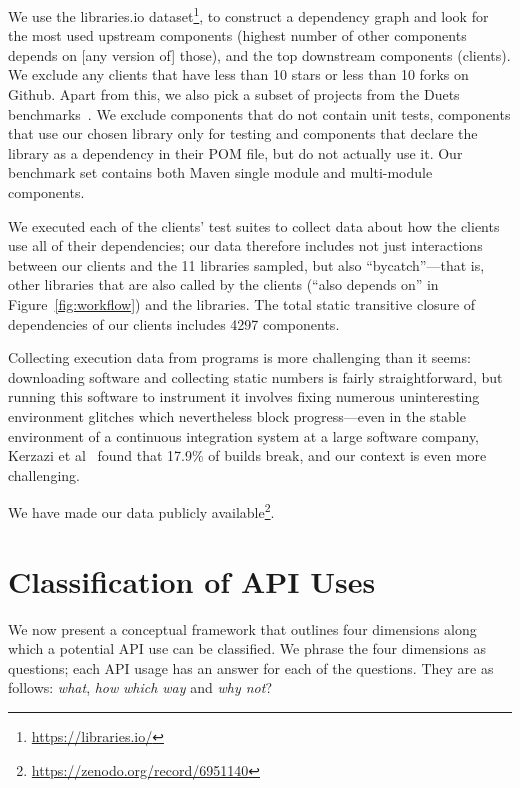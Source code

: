 We use the libraries.io dataset\footnote{\url{https://libraries.io/}}, to construct a dependency graph and look for the most used upstream components (highest number of other components depends on [any version of] those), 
and the top downstream components (clients). We exclude any clients that have less than 10 stars or less than 10 forks on Github.  Apart from this, we also pick a subset of projects from the
Duets benchmarks~\cite{durieux21}. We exclude components that do not contain unit tests, components that use our chosen library only for testing
and components that declare the library as a dependency in their POM file, but do not actually use it. Our benchmark set contains both Maven single module and multi-module components.

We executed each of the clients' test suites to collect data about how the clients use all of their dependencies; our data therefore includes not just interactions between our clients and the 11 libraries sampled, but also ``bycatch''---that is, other libraries that are also called by the clients (``also depends on'' in Figure~\ref{fig:workflow}) and the libraries. The total static transitive closure of dependencies of our clients includes 4297 components.

Collecting execution data from programs is more challenging than it seems: downloading software and collecting static numbers is fairly straightforward, but running this software to instrument it involves fixing numerous uninteresting environment glitches which nevertheless block progress---even in the stable environment of a continuous integration system at a large software company, Kerzazi et al~\cite{kerzazi14:_why_do_autom_build_break} found that 17.9\% of builds break, and our context is even more challenging.

We have made our data publicly available\footnote{\url{https://zenodo.org/record/6951140}}.


\section{Classification of API Uses}
\label{sec:classification}

We now present a conceptual framework that outlines four dimensions along which a potential API use can be classified. We phrase the four dimensions as questions; each API usage has an answer for each of the questions. They are as follows: \emph{what}, \emph{how} \emph{which way} and \emph{why not}?

